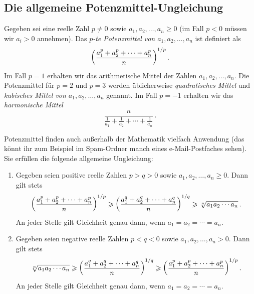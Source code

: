 \subsection*{Die allgemeine Potenzmittel-Ungleichung}
\begin{definition}
	Gegeben sei eine reelle Zahl $p\neq 0$ sowie $a_1,a_2,\dotsc,a_n\geqslant 0$ (im Fall $p<0$ müssen wir $a_i>0$ annehmen). Das \emph{$p$-te Potenzmittel von $a_1,a_2,\dotsc,a_n$} ist definiert als
	\begin{equation*}
		\parens*{\frac{a_1^p+a_2^p+\dotsb+a_n^p}{n}}^{1/p}\,.
	\end{equation*}
	Im Fall $p=1$ erhalten wir das arithmetische Mittel der Zahlen $a_1,a_2,\dotsc,a_n$. Die Potenzmittel für $p=2$ und $p=3$ werden üblicherweise \emph{quadratisches Mittel} und \emph{kubisches Mittel von $a_1,a_2,\dotsc,a_n$} genannt. Im Fall $p=-1$ erhalten wir das \emph{harmonische Mittel}
	\begin{equation*}
		\frac{n}{\frac1{a_1}+\frac1{a_2}+\dotsb+\frac1{a_n}}\,.
	\end{equation*}
\end{definition}
Potenzmittel finden auch außerhalb der Mathematik vielfach Anwendung (das könnt ihr zum Beispiel im Spam-Ordner manch eines e-Mail-Postfaches sehen). Sie erfüllen die folgende allgemeine Ungleichung:
\begin{satzmitnamen}\leavevmode
	\begin{enumerate}
		\item Gegeben seien positive reelle Zahlen $p>q>0$ sowie $a_1,a_2,\dotsc,a_n\geqslant 0$. Dann gilt stets
		\begin{equation*}
			\parens*{\frac{a_1^p+a_2^p+\dotsb+a_n^p}{n}}^{1/p}\geqslant \parens*{\frac{a_1^q+a_2^q+\dotsb+a_n^q}{n}}^{1/q}\geqslant \sqrt[n]{a_1a_2\dotsm a_n}\,.
		\end{equation*}
		An jeder Stelle gilt Gleichheit genau dann, wenn $a_1=a_2=\dotsb=a_n$.
		\item Gegeben seien negative reelle Zahlen $p<q<0$ sowie $a_1,a_2,\dotsc,a_n> 0$. Dann gilt stets
		\begin{equation*}
			\sqrt[n]{a_1a_2\dotsm a_n}\geqslant \parens*{\frac{a_1^q+a_2^q+\dotsb+a_n^q}{n}}^{1/q}\geqslant  \parens*{\frac{a_1^p+a_2^p+\dotsb+a_n^p}{n}}^{1/p}\,.
		\end{equation*}
		An jeder Stelle gilt Gleichheit genau dann, wenn $a_1=a_2=\dotsb=a_n$.
	\end{enumerate}
\end{satzmitnamen}
